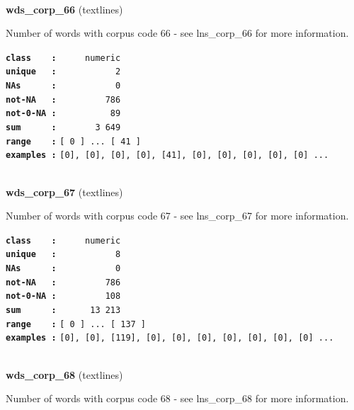 \documentclass[]{article}
\begin{document}
~

\textbf{wds\_corp\_66} (textlines)

Number of words with corpus code 66 - see lns\_corp\_66 for more
information.

\textbf{\texttt{class\ \ \ \ :}} \texttt{~~~~~numeric}\\
\textbf{\texttt{unique\ \ \ :}} \texttt{~~~~~~~~~~~2}\\
\textbf{\texttt{NAs\ \ \ \ \ \ :}} \texttt{~~~~~~~~~~~0}\\
\textbf{\texttt{not-NA\ \ \ :}} \texttt{~~~~~~~~~786}\\
\textbf{\texttt{not-0-NA\ :}} \texttt{~~~~~~~~~~89}\\
\textbf{\texttt{sum\ \ \ \ \ \ :}} \texttt{~~~~~~~3~649}\\
\textbf{\texttt{range\ \ \ \ :}}
\texttt{{[}\ 0\ {]}\ ...\ {[}\ 41\ {]}}\\
\textbf{\texttt{examples\ :}}
\texttt{{[}0{]},\ {[}0{]},\ {[}0{]},\ {[}0{]},\ {[}41{]},\ {[}0{]},\ {[}0{]},\ {[}0{]},\ {[}0{]},\ {[}0{]}\ ...}\\

~

\textbf{wds\_corp\_67} (textlines)

Number of words with corpus code 67 - see lns\_corp\_67 for more
information.

\textbf{\texttt{class\ \ \ \ :}} \texttt{~~~~~numeric}\\
\textbf{\texttt{unique\ \ \ :}} \texttt{~~~~~~~~~~~8}\\
\textbf{\texttt{NAs\ \ \ \ \ \ :}} \texttt{~~~~~~~~~~~0}\\
\textbf{\texttt{not-NA\ \ \ :}} \texttt{~~~~~~~~~786}\\
\textbf{\texttt{not-0-NA\ :}} \texttt{~~~~~~~~~108}\\
\textbf{\texttt{sum\ \ \ \ \ \ :}} \texttt{~~~~~~13~213}\\
\textbf{\texttt{range\ \ \ \ :}}
\texttt{{[}\ 0\ {]}\ ...\ {[}\ 137\ {]}}\\
\textbf{\texttt{examples\ :}}
\texttt{{[}0{]},\ {[}0{]},\ {[}119{]},\ {[}0{]},\ {[}0{]},\ {[}0{]},\ {[}0{]},\ {[}0{]},\ {[}0{]},\ {[}0{]}\ ...}\\

~

\textbf{wds\_corp\_68} (textlines)

Number of words with corpus code 68 - see lns\_corp\_68 for more
information.
\end{document}
